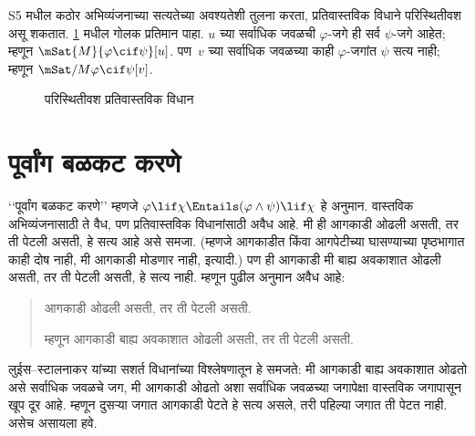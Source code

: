 S5 मधील कठोर अभिव्यंजनाच्या सत्यतेच्या अवश्यतेशी
तुलना करता, प्रतिवास्तविक
विधाने परिस्थितीवश
असू शकतात.
\ref{con:min:tf:fig:contingent} मधील
गोलक प्रतिमान पाहा.
$u$ च्या सर्वाधिक
जवळची $\varphi$-जगे
ही सर्व $\psi$-जगे
आहेत; म्हणून
$\mSat{M}{\varphi \cif
  \psi}[u]$. पण~$v$
च्या सर्वाधिक जवळच्या
काही $\varphi$-जगांत
$\psi$ सत्य नाही;
म्हणून
$\mSat/{M}{\varphi \cif \psi}[v]$.
\begin{figure}
\begin{center}
\end{center}
\caption{परिस्थितीवश प्रतिवास्तविक विधान}
\label{con:min:tf:fig:contingent}
\end{figure}











\section{पूर्वांग बळकट करणे}\label{cnt:min:agg:sec}

‘‘पूर्वांग बळकट करणे’’ म्हणजे
$\varphi \lif \chi \Entails
(\varphi \land \psi) \lif \chi$
हे अनुमान. वास्तविक
अभिव्यंजनासाठी ते वैध,
पण प्रतिवास्तविक
विधानांसाठी अवैध आहे.
मी ही आगकाडी ओढली असती,
तर ती पेटली असती,
हे सत्य आहे असे समजा.
(म्हणजे आगकाडीत किंवा
आगपेटीच्या घासण्याच्या
पृष्ठभागात काही दोष नाही,
मी आगकाडी मोडणार नाही,
इत्यादी.) पण ही
आगकाडी मी बाह्य
अवकाशात ओढली असती,
तर ती पेटली असती,
हे सत्य नाही. म्हणून
पुढील अनुमान अवैध आहे:
\begin{quote}
  आगकाडी ओढली असती,
  तर ती पेटली असती.

  म्हणून आगकाडी बाह्य
  अवकाशात ओढली असती,
  तर ती पेटली असती.
\end{quote}

लुईस--स्टालनाकर यांच्या
सशर्त विधानांच्या
विश्लेषणातून हे
समजते: मी आगकाडी
बाह्य अवकाशात
ओढतो असे सर्वाधिक
जवळचे जग, मी
आगकाडी ओढतो
अशा सर्वाधिक
जवळच्या जगापेक्षा
वास्तविक जगापासून
खूप दूर आहे.
म्हणून दुसऱ्या
जगात आगकाडी
पेटते हे सत्य
असले, तरी
पहिल्या जगात
ती पेटत नाही.
असेच असायला हवे.

